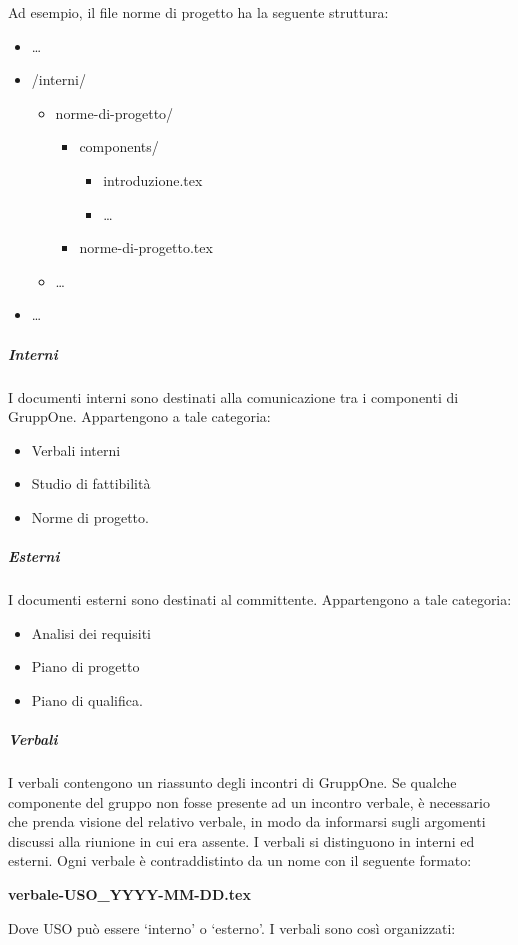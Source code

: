 \documentclass[../../norme-di-progetto.tex]{subfiles}
\begin{document}
Ad esempio, il file norme di progetto ha la seguente struttura:

\begin{itemize}
  \item[] \ldots
  \item[] /interni/
        \begin{itemize}
          \item[] norme-di-progetto/
                \begin{itemize}
                  \item[] components/
                        \begin{itemize}
                          \item[] introduzione.tex
                          \item[] \ldots
                        \end{itemize}
                  \item[] norme-di-progetto.tex
                \end{itemize}
          \item[] \ldots
        \end{itemize}
  \item[] \ldots
\end{itemize}

\subparagraph{Interni}%
\label{subp:suddivisione_dei_documenti/interni}
I documenti interni sono destinati alla comunicazione tra i componenti di GruppOne. Appartengono a tale categoria:

\begin{itemize}
  \item Verbali interni
  \item Studio di fattibilità
  \item Norme di progetto.
\end{itemize}

\subparagraph{Esterni}%
\label{subp:suddivisione_dei_documenti/esterni}
I documenti esterni sono destinati al committente. Appartengono a tale categoria:

\begin{itemize}
  \item Analisi dei requisiti
  \item Piano di progetto
  \item Piano di qualifica.
\end{itemize}

\subparagraph{Verbali}%
\label{subp:verbali}
I verbali contengono un riassunto degli incontri di GruppOne.
Se qualche componente del gruppo non fosse presente ad un incontro verbale, è necessario che prenda visione del relativo verbale, in modo da informarsi sugli argomenti discussi alla riunione in cui era assente.
I verbali si distinguono in interni ed esterni. Ogni verbale è contraddistinto da un nome con il seguente formato:
\begin{center}
  \textbf{verbale-USO\_YYYY-MM-DD.tex}
\end{center}
Dove USO può essere `interno' o `esterno'. I verbali sono così organizzati:
\end{document}
